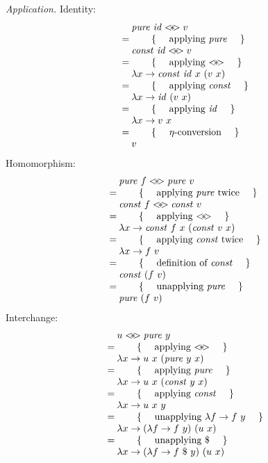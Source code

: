\begin{parts}
    \begin{solution}
        \allowdisplaybreaks
        \emph{Application.} Identity:
        \begin{displaymath}
            \begin{array}[]{cl}
                \expr{\mathit{pure}~\mathit{id} \applicative v}
                \hint{applying $\mathit{pure}$}
                \expr{\mathit{const}~\mathit{id} \applicative v}
                \hint{applying $\applicative$}
                \expr{\lambda x \to \mathit{const}~\mathit{id}~x~(v~x)}
                \hint{applying $\mathit{const}$}
                \expr{\lambda x \to \mathit{id}~(v~x)}
                \hint{applying $\mathit{id}$}
                \expr{\lambda x \to v~x}
                \hint{$\eta$-conversion}
                \lastexpr{v}
            \end{array}
        \end{displaymath}
        Homomorphism:
        \begin{displaymath}
            \begin{array}[]{cl}
                \expr{\mathit{pure}~f \applicative \mathit{pure}~v}
                \hint{applying $\mathit{pure}$ twice}
                \expr{\mathit{const}~f \applicative \mathit{const}~v}
                \hint{applying $\applicative$}
                \expr{\lambda x \to \mathit{const}~f~x~(\mathit{const}~v~x)}
                \hint{applying $\mathit{const}$ twice}
                \expr{\lambda x \to f~v}
                \hint{definition of $\mathit{const}$}
                \expr{\mathit{const}~(f~v)}
                \hint{unapplying $\mathit{pure}$}
                \lastexpr{\mathit{pure}~(f~v)}
            \end{array}
        \end{displaymath}
        Interchange:
        \begin{displaymath}
            \begin{array}[]{cl}
                \expr{u \applicative \mathit{pure}~y}
                \hint{applying $\applicative$}
                \expr{\lambda x \to u~x~(\mathit{pure}~y~x)}
                \hint{applying $\mathit{pure}$}
                \expr{\lambda x \to u~x~(\mathit{const}~y~x)}
                \hint{applying $\mathit{const}$}
                \expr{\lambda x \to u~x~y}
                \hint{unapplying $\lambda f \to f~y$}
                \expr{\lambda x \to (\lambda f \to f~y)~(u~x)}
                \hint{unapplying $\$$}
                \expr{\lambda x \to (\lambda f \to f~\$~y)~(u~x)}

\end{array}
\end{displaymath}
\end{solution}
\end{parts}
